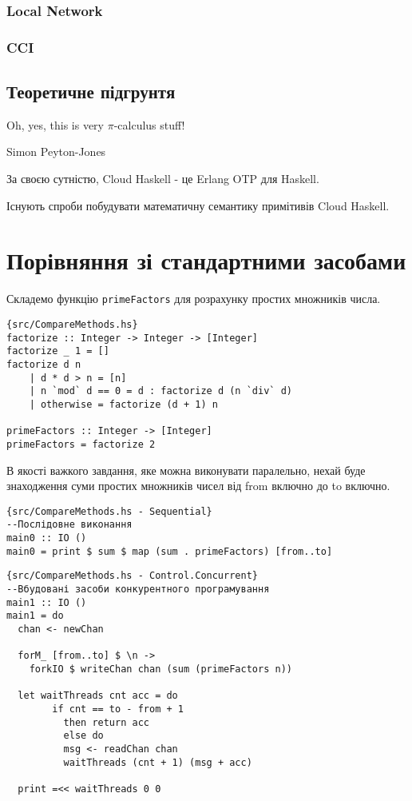 \documentclass[12pt]{article}
\begin{document}
\subsubsection*{Local Network}
\subsubsection*{CCI}

\subsection{Теоретичне підгрунтя}

\epigraph{Oh, yes, this is very $\pi$-calculus stuff!}{Simon Peyton-Jones\cite{cloudSLPJ}}

За своєю сутністю, Cloud Haskell - це Erlang OTP для Haskell.

Існують спроби\cite{cloudSemantics}\cite{haskellInCloud} побудувати математичну семантику примітивів Cloud Haskell.\\


\section{Порівняння зі стандартними засобами}
Складемо функцію \lstinline{primeFactors} для розрахунку простих множників числа. 

\begin{lstlisting}{src/CompareMethods.hs}
factorize :: Integer -> Integer -> [Integer]
factorize _ 1 = [] 
factorize d n 
    | d * d > n = [n]
    | n `mod` d == 0 = d : factorize d (n `div` d)
    | otherwise = factorize (d + 1) n

primeFactors :: Integer -> [Integer]
primeFactors = factorize 2
\end{lstlisting}

В якості важкого завдання, яке можна виконувати паралельно, нехай буде знаходження суми простих множників чисел від from включно до to включно.

\begin{lstlisting}{src/CompareMethods.hs - Sequential}
--Послідовне виконання
main0 :: IO ()
main0 = print $ sum $ map (sum . primeFactors) [from..to]
\end{lstlisting}

\begin{lstlisting}{src/CompareMethods.hs - Control.Concurrent}
--Вбудовані засоби конкурентного програмування
main1 :: IO ()
main1 = do
  chan <- newChan
  
  forM_ [from..to] $ \n ->
    forkIO $ writeChan chan (sum (primeFactors n))

  let waitThreads cnt acc = do
        if cnt == to - from + 1
          then return acc
          else do
          msg <- readChan chan
          waitThreads (cnt + 1) (msg + acc)
          
  print =<< waitThreads 0 0

\end{lstlisting}
\end{document}
